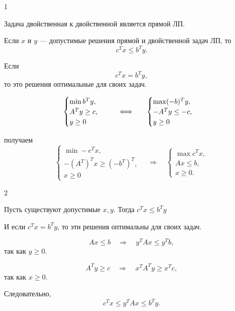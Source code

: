 \documentclass[12pt,a4paper]{article}
\begin{document}
\begin{theorem}{1}

Задача двойственная к двойственной является прямой ЛП.

\end{theorem}

\begin{proofbox}{}
Если $x$ и $y$ --- допустимые решения прямой и двойственной задач ЛП, то
\[
c^Tx\leq b^Ty.
\]

Если
\[
c^Tx=b^Ty,
\]
то это решения оптимальные для своих задач.

\[
\begin{array}{c@{\qquad\Longleftrightarrow\qquad}c}
\begin{cases}
\min b^Ty,\\
A^Ty\geq c,\\
y\geq 0
\end{cases}
&
\begin{cases}
\max (-b)^Ty,\\
-A^Ty\leq -c,\\
y\geq 0
\end{cases}
\end{array}
\]

получаем
\[
\begin{cases}
\min -c^Tx,\\
-(A^T)^Tx\geq (-b^T)^T,\\
x\geq 0
\end{cases}
\quad\Longrightarrow\quad
\begin{cases}
\max c^Tx,\\
Ax\leq b,\\
x\geq 0.
\end{cases}
\]
\end{proofbox}

\begin{theorem}{2}

Пусть существуют допустимые $x,y$. Тогда $c^Tx\leq b^Ty$

И если $c^Tx = b^Ty$, то эти решения оптимальны для своих задач.

\end{theorem}

\begin{proofbox}{}

\[
Ax\leq b
\quad\Longrightarrow\quad
y^TAx\leq y^Tb,
\]
так как $y\geq 0$.

\[
A^Ty\geq c
\quad\Longrightarrow\quad
x^TA^Ty\geq x^Tc,
\]
так как $x\geq 0$.

Следовательно,
\[
c^Tx\leq y^TAx\leq b^Ty.
\]

\end{proofbox}
\end{document}
